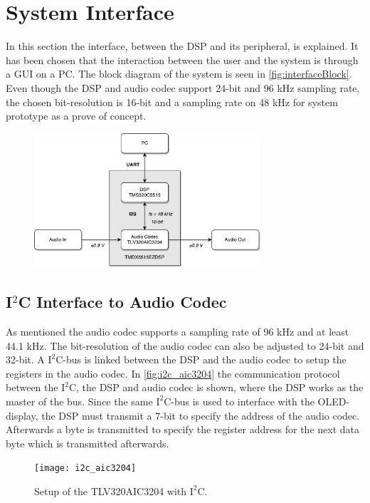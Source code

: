 \section{System Interface}

In this section the interface, between the DSP and its peripheral, is explained. It has been chosen that the interaction between the user and the system is through a GUI on a PC. The block diagram of the system is seen in \autoref{fig:interfaceBlock}. Even though the DSP and audio codec support 24-bit and 96 kHz sampling rate, the chosen bit-resolution is 16-bit and a sampling rate on 48 kHz for system prototype as a prove of concept.

\begin{figure}[H]
\centering
\includegraphics[width=0.75\textwidth]{figures/interfaceBlock.pdf}
\caption{}
\label{fig:interfaceBlock}
\end{figure}
\subsection*{I$^2$C Interface to Audio Codec}

As mentioned the audio codec supports a sampling rate of 96 kHz and at least 44.1 kHz. The bit-resolution of the audio codec can also be adjusted to 24-bit and 32-bit. A $\text{I}^2$C-bus is linked between the DSP and the audio codec to setup the registers in the audio codec. In \autoref{fig:i2c_aic3204} the communication protocol between the $\text{I}^2$C, the DSP and audio codec is shown, where the DSP works as the master of the bus. Since the same $\text{I}^2$C-bus is used to interface with the OLED-display, the DSP must transmit a 7-bit to specify the address of the audio codec. Afterwards a byte is transmitted to specify the register address for the next data byte which is transmitted afterwards.

\begin{figure}[H]
\centering
\texttt{[image: i2c\_aic3204]}
\caption{Setup of the TLV320AIC3204 with $\text{I}^2$C.}
\label{fig:i2c_aic3204}
\end{figure}  

